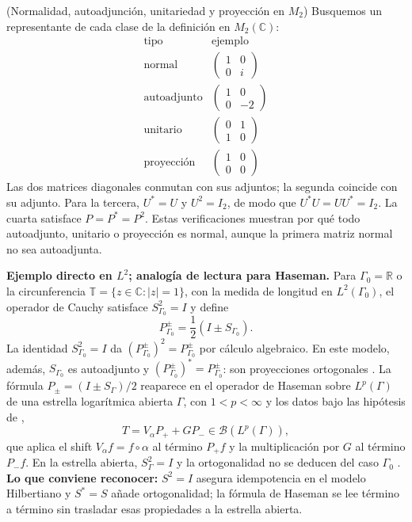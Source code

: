 \begin{cthejemplo}{(Normalidad, autoadjunción, unitariedad y proyección en $M_2$)}
Busquemos un representante de cada clase de la definición en
$M_2(\mathbb C)$:
\[
\begin{array}{c|c}
\text{tipo}&\text{ejemplo}\\ \hline
\text{normal}&\begin{pmatrix}1&0\\0&i\end{pmatrix}\\[2mm]
\text{autoadjunto}&\begin{pmatrix}1&0\\0&-2\end{pmatrix}\\[2mm]
\text{unitario}&\begin{pmatrix}0&1\\1&0\end{pmatrix}\\[2mm]
\text{proyección}&\begin{pmatrix}1&0\\0&0\end{pmatrix}
\end{array}
\]
Las dos matrices diagonales conmutan con sus adjuntos; la segunda
coincide con su adjunto. Para la tercera, $U^*=U$ y $U^2=I_2$,
de modo que $U^*U=UU^*=I_2$. La cuarta satisface
$P=P^*=P^2$. Estas verificaciones muestran por qué todo
autoadjunto, unitario o proyección es normal, aunque la primera
matriz normal no sea autoadjunta.
\end{cthejemplo}

\begin{investigacion}
\textbf{Ejemplo directo en $L^2$; analogía de lectura para Haseman.}
Para $\Gamma_0=\mathbb R$ o la circunferencia
$\mathbb T=\{z\in\mathbb C:|z|=1\}$, con la medida de longitud en $L^2(\Gamma_0)$,
el operador de Cauchy satisface $S_{\Gamma_0}^2=I$ y define
\[
 P_{\Gamma_0}^\pm=\frac12(I\pm S_{\Gamma_0}).
\]
La identidad $S_{\Gamma_0}^2=I$ da $(P_{\Gamma_0}^\pm)^2=P_{\Gamma_0}^\pm$ por cálculo
algebraico. En este modelo, además, $S_{\Gamma_0}$ es autoadjunto y
$(P_{\Gamma_0}^\pm)^*=P_{\Gamma_0}^\pm$: son proyecciones ortogonales
\cite[Sec.~2, p.~22]{BFK2006}. La fórmula
$P_\pm=(I\pm S_\Gamma)/2$ reaparece en el operador
de Haseman sobre $L^p(\Gamma)$ de una estrella logarítmica abierta $\Gamma$, con
$1<p<\infty$ y los datos bajo las hipótesis de \cite{Karlovich2017},
\[
 T=V_\alpha P_+ + GP_-\in\mathcal B(L^p(\Gamma)),
\]
que aplica el shift $V_\alpha f=f\circ\alpha$ al término $P_+f$ y la
multiplicación por $G$ al término $P_-f$. En la estrella abierta,
$S_\Gamma^2=I$ y la ortogonalidad no se deducen del caso $\Gamma_0$
\cite[(1.2)]{Karlovich2017}.
\textbf{Lo que conviene reconocer:} $S^2=I$ asegura idempotencia en el modelo
Hilbertiano y $S^*=S$ añade ortogonalidad; la fórmula de Haseman se lee término a
término sin trasladar esas propiedades a la estrella abierta.
\end{investigacion}

